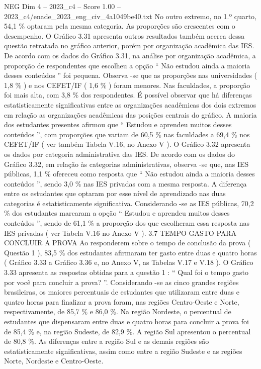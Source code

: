 \begin{textsample}{NEG Dim 4 – 2023\_c4 – Score 1.00 – 2023\_c4/enade\_2023\_eng\_civ\_4a1049be40.txt}
No outro extremo, no 1.º quarto, 54,1 \% optaram pela mesma categoria.
As proporções são crescentes com o desempenho.
O Gráfico 3.31 apresenta outros resultados também acerca dessa questão retratada no gráfico anterior, porém por organização acadêmica das IES.
De acordo com os dados do Gráfico 3.31, na análise por organização acadêmica, a proporção de respondentes que escolheu a opção “ Não estudou ainda a maioria desses conteúdos ” foi pequena.
Observa -se que as proporções nas universidades ( 1,8 \% ) e nos CEFET/IF ( 1,6 \% ) foram menores.
Nas faculdades, a proporção foi mais alta, com 3,8 \% dos respondentes.
É possível observar que há diferenças estatisticamente significativas entre as organizações acadêmicas dos dois extremos em relação as organizações acadêmicas das posições centrais do gráfico.
A maioria dos estudantes presentes afirmou que “ Estudou e aprendeu muitos desses conteúdos ”, com proporções que variam de 60,5 \% nas faculdades a 69,4 \% nos CEFET/IF ( ver também Tabela V.16, no Anexo V ).
O Gráfico 3.32 apresenta os dados por categoria administrativa das IES.
De acordo com os dados do Gráfico 3.32, em relação às categorias administrativas, observa -se que, nas IES públicas, 1,1 \% ofereceu como resposta que “ Não estudou ainda a maioria desses conteúdos ”, sendo 3,0 \% nas IES privadas com a mesma resposta.
A diferença entre os estudantes que optaram por esse nível de aprendizado nas duas categorias é estatisticamente significativa.
Considerando -se as IES públicas, 70,2 \% dos estudantes marcaram a opção “ Estudou e aprendeu muitos desses conteúdos ”, sendo de 61,1 \% a proporção dos que escolheram essa resposta nas IES privadas ( ver Tabela V.16 no Anexo V ). 3.7 TEMPO GASTO PARA CONCLUIR A PROVA Ao responderem sobre o tempo de conclusão da prova ( Questão 1 ), 83,5 \% dos estudantes afirmaram ter gasto entre duas e quatro horas ( Gráfico 3.33 a Gráfico 3.36 e, no Anexo V, as Tabelas V.17 e V.18 ).
O Gráfico 3.33 apresenta as respostas obtidas para a questão 1 : “ Qual foi o tempo gasto por você para concluir a prova? ”.
Considerando -se as cinco grandes regiões brasileiras, os maiores percentuais de estudantes que utilizaram entre duas e quatro horas para finalizar a prova foram, nas regiões Centro-Oeste e Norte, respectivamente, de 85,7 \% e 86,0 \%.
Na região Nordeste, o percentual de estudantes que dispensaram entre duas e quatro horas para concluir a prova foi de 85,4 \% e, na região Sudeste, de 82,9 \%.
A região Sul apresentou o percentual de 80,8 \%.
As diferenças entre a região Sul e as demais regiões são estatisticamente significativas, assim como entre a região Sudeste e as regiões Norte, Nordeste e Centro-Oeste.

\end{textsample}
